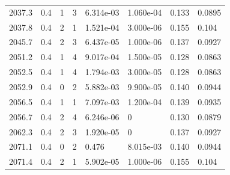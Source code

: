 \documentclass[preview]{standalone}
\begin{document}
{{{{{{{\begin{tabular}{L{1.2cm}C{1.2cm} C{0.3cm}C{0.5cm} C{1.4cm}C{1.4cm} C{1.4cm}C{1.4cm}}
  2037.3  &   0.4  & 1     &  3 &  6.314e-03  & 1.060e-04  & 0.133 &  0.0895   \\ 
  2037.8  &   0.4  & 2     &  1 &  1.521e-04  & 3.000e-06  & 0.155 &  0.104   \\ 
  2045.7  &   0.4  & 2     &  3 &  6.437e-05  & 1.000e-06  & 0.137 &  0.0927   \\ 
  2051.2  &   0.4  & 1     &  4 &  9.017e-04  & 1.500e-05  & 0.128 &  0.0863   \\ 
  2052.5  &   0.4  & 1     &  4 &  1.794e-03  & 3.000e-05  & 0.128 &  0.0863   \\ 
  2052.9  &   0.4  & 0     &  2 &  5.882e-03  & 9.900e-05  & 0.140 &  0.0944   \\ 
  2056.5  &   0.4  & 1     &  1 &  7.097e-03  & 1.200e-04  & 0.139 &  0.0935   \\ 
  2056.7  &   0.4  & 2     &  4 &  6.246e-06  & 0  & 0.130 &  0.0879   \\ 
  2062.3  &   0.4  & 2     &  3 &  1.920e-05  & 0  & 0.137 &  0.0927   \\ 
  2071.1  &   0.4  & 0     &  2 &  0.476  & 8.015e-03  & 0.140 &  0.0944   \\ 
  2071.4  &   0.4  & 2     &  1 &  5.902e-05  & 1.000e-06  & 0.155 &  0.104   \\ 
\hline 
\end{tabular} 

}}}}}}}
\end{document}
